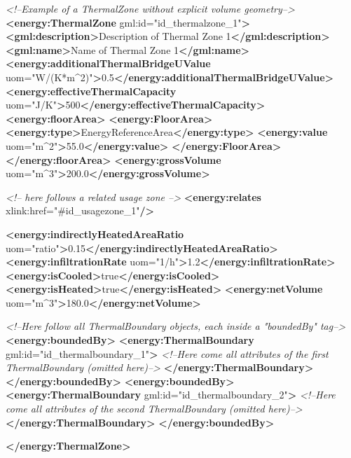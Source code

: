 \documentclass[a4paper,12pt]{article}
\newenvironment{Shaded}{}{}
\newcommand{\KeywordTok}[1]{\textcolor[rgb]{0.00,0.44,0.13}{\textbf{{#1}}}}
\newcommand{\StringTok}[1]{\textcolor[rgb]{0.25,0.44,0.63}{{#1}}}
\newcommand{\CommentTok}[1]{\textcolor[rgb]{0.38,0.63,0.69}{\textit{{#1}}}}
\newcommand{\OtherTok}[1]{\textcolor[rgb]{0.00,0.44,0.13}{{#1}}}
\newcommand{\NormalTok}[1]{{#1}}
\begin{document}
\begin{Shaded}
\begin{Highlighting}[]
\CommentTok{<!--Example of a ThermalZone without explicit volume geometry-->}
\KeywordTok{<energy:ThermalZone}\OtherTok{ gml:id=}\StringTok{"id_thermalzone_1"}\KeywordTok{>}
    \KeywordTok{<gml:description>}\NormalTok{Description of Thermal Zone 1}\KeywordTok{</gml:description>}
    \KeywordTok{<gml:name>}\NormalTok{Name of Thermal Zone 1}\KeywordTok{</gml:name>}
    \KeywordTok{<energy:additionalThermalBridgeUValue}\OtherTok{ uom=}\StringTok{"W/(K*m^2)"}\KeywordTok{>}\NormalTok{0.5}\KeywordTok{</energy:additionalThermalBridgeUValue>}
    \KeywordTok{<energy:effectiveThermalCapacity}\OtherTok{ uom=}\StringTok{"J/K"}\KeywordTok{>}\NormalTok{500}\KeywordTok{</energy:effectiveThermalCapacity>}
    \KeywordTok{<energy:floorArea>}
        \KeywordTok{<energy:FloorArea>}
            \KeywordTok{<energy:type>}\NormalTok{EnergyReferenceArea}\KeywordTok{</energy:type>}
            \KeywordTok{<energy:value}\OtherTok{ uom=}\StringTok{"m^2"}\KeywordTok{>}\NormalTok{55.0}\KeywordTok{</energy:value>}
        \KeywordTok{</energy:FloorArea>}
    \KeywordTok{</energy:floorArea>}
    \KeywordTok{<energy:grossVolume}\OtherTok{ uom=}\StringTok{"m^3"}\KeywordTok{>}\NormalTok{200.0}\KeywordTok{</energy:grossVolume>}

    \CommentTok{<!-- here follows a related usage zone -->}
    \KeywordTok{<energy:relates}\OtherTok{ xlink:href=}\StringTok{"#id_usagezone_1"}\KeywordTok{/>}

    \KeywordTok{<energy:indirectlyHeatedAreaRatio}\OtherTok{ uom=}\StringTok{"ratio"}\KeywordTok{>}\NormalTok{0.15}\KeywordTok{</energy:indirectlyHeatedAreaRatio>}
    \KeywordTok{<energy:infiltrationRate}\OtherTok{ uom=}\StringTok{"1/h"}\KeywordTok{>}\NormalTok{1.2}\KeywordTok{</energy:infiltrationRate>}
    \KeywordTok{<energy:isCooled>}\NormalTok{true}\KeywordTok{</energy:isCooled>}
    \KeywordTok{<energy:isHeated>}\NormalTok{true}\KeywordTok{</energy:isHeated>}
    \KeywordTok{<energy:netVolume}\OtherTok{ uom=}\StringTok{"m^3"}\KeywordTok{>}\NormalTok{180.0}\KeywordTok{</energy:netVolume>}

    \CommentTok{<!--Here follow all ThermalBoundary objects, each inside a "boundedBy" tag-->}
    \KeywordTok{<energy:boundedBy>}
        \KeywordTok{<energy:ThermalBoundary}\OtherTok{ gml:id=}\StringTok{"id_thermalboundary_1"}\KeywordTok{>}
            \CommentTok{<!--Here come all attributes of the first ThermalBoundary (omitted here)-->}
        \KeywordTok{</energy:ThermalBoundary>}
    \KeywordTok{</energy:boundedBy>}
    \KeywordTok{<energy:boundedBy>}
        \KeywordTok{<energy:ThermalBoundary}\OtherTok{ gml:id=}\StringTok{"id_thermalboundary_2"}\KeywordTok{>}
            \CommentTok{<!--Here come all attributes of the second ThermalBoundary (omitted here)-->}
        \KeywordTok{</energy:ThermalBoundary>}
    \KeywordTok{</energy:boundedBy>}

\KeywordTok{</energy:ThermalZone>}
\end{Highlighting}
\end{Shaded}
\end{document}
